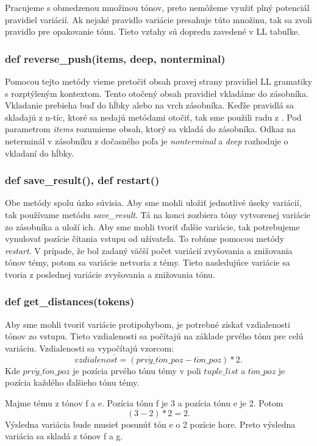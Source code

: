 Pracujeme s obmedzenou množinou tónov, preto nemôžeme využiť plný potenciál pravidiel variácií. Ak nejaké pravidlo variácie presahuje túto množinu, tak sa zvoli pravidlo pre opakovanie tónu. Tieto vzťahy sú dopredu zavedené v LL tabuľke.

\subsubsection*{def reverse\_push(items, deep, nonterminal)}
Pomocou tejto metódy vieme pretočiť obsah pravej strany pravidiel LL gramatiky s rozptýleným kontextom. Tento otočený obsah pravidiel vkladáme do zásobníka. Vkladanie prebieha buď do hĺbky alebo na vrch zásobníka. Keďže pravidlá sa skladajú z n-tíc, ktoré sa nedajú metódami otočiť, tak sme použili radu z \cite{stack:site}. Pod parametrom \textit{items} rozumieme obsah, ktorý sa vkladá do zásobníka. Odkaz na neterminál v zásobníku z dočasného poľa je \textit{nonterminal} a \textit{deep} rozhoduje o vkladaní do hĺbky.

\subsubsection*{def save\_result(), def restart()}
Obe metódy spolu úzko súvisia. Aby sme mohli uložiť jednotlivé úseky variácií, tak používame metódu \textit{save\_result}. Tá na konci zozbiera tóny vytvorenej variácie zo zásobníka a uloží ich. Aby sme mohli tvoriť ďalšie variácie, tak potrebujeme vynulovať pozície čítania vstupu od užívateľa. To robíme pomocou metódy \textit{restart}. V prípade, že bol zadaný väčší počet variácií zvyšovania a znižovania tónov témy, potom sa variácie netvoria z témy. Tieto nasledujúce variácie sa tvoria z poslednej variácie zvyšovania a znižovania tónu.

\subsubsection*{def get\_distances(tokens)}
Aby sme mohli tvoriť variácie protipohybom, je potrebné získať vzdialenosti tónov zo vstupu. Tieto vzdialenosti sa počítajú na základe prvého tónu pre celú variáciu. Vzdialenosti sa vypočítajú vzorcom: $$vzdialenos\check{t} = (prv\acute{y}\_t\acute{o}n\_poz - t\acute{o}n\_poz) * 2.$$ Kde $prv\acute{y}\_t\acute{o}n\_poz$ je pozícia prvého tónu témy v poli $tuple\_list$ a $t\acute{o}n\_poz$ je pozícia každého ďalšieho tónu témy.

\begin{example}
Majme tému z tónov f a e. Pozícia tónu f je 3 a pozícia tónu e je 2. Potom $$(3 - 2) * 2 = 2.$$ Výsledna variácia bude musieť posunúť tón e o 2 pozície hore. Preto výsledna variácia sa skladá z tónov f a g.
\end{example}

